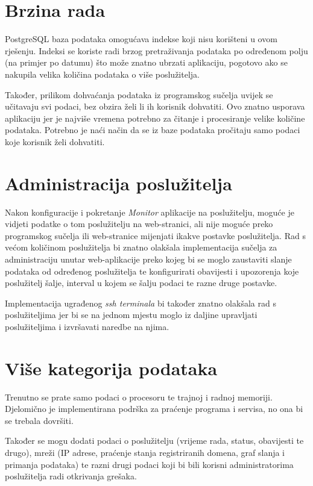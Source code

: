 \documentclass[zavrsnirad]{fer}
\begin{document}
\section{Brzina rada}
PostgreSQL baza podataka omogućava indekse koji nisu korišteni u ovom rješenju. Indeksi se koriste radi brzog pretraživanja podataka po određenom polju (na primjer po datumu) što može znatno ubrzati aplikaciju, pogotovo ako se nakupila velika količina podataka o više poslužitelja.

Također, prilikom dohvaćanja podataka iz programskog sučelja uvijek se učitavaju svi podaci, bez obzira želi li ih korisnik dohvatiti. Ovo znatno usporava aplikaciju jer je najviše vremena potrebno za čitanje i procesiranje velike količine podataka. Potrebno je naći način da se iz baze podataka pročitaju samo podaci koje korisnik želi dohvatiti.

\section{Administracija poslužitelja}
Nakon konfiguracije i pokretanje \textit{Monitor} aplikacije na poslužitelju, moguće je vidjeti podatke o tom poslužitelju na web-stranici, ali nije moguće preko programskog sučelja ili web-stranice mijenjati ikakve postavke poslužitelja. Rad s većom količinom poslužitelja bi znatno olakšala implementacija sučelja za administraciju unutar web-aplikacije preko kojeg bi se moglo zaustaviti slanje podataka od određenog poslužitelja te konfigurirati obavijesti i upozorenja koje poslužitelj šalje, interval u kojem se šalju podaci te razne druge postavke.

Implementacija ugrađenog \textit{ssh terminala} bi također znatno olakšala rad s poslužiteljima jer bi se na jednom mjestu moglo iz daljine upravljati poslužiteljima i izvršavati naredbe na njima.

\section{Više kategorija podataka}
Trenutno se prate samo podaci o procesoru te trajnoj i radnoj memoriji. Djelomično je implementirana podrška za praćenje programa i servisa, no ona bi se trebala dovršiti.

Također se mogu dodati podaci o poslužitelju (vrijeme rada, status, obavijesti te drugo), mreži (IP adrese, praćenje stanja registriranih domena, graf slanja i primanja podataka) te razni drugi podaci koji bi bili korisni administratorima poslužitelja radi otkrivanja grešaka.
\end{document}
